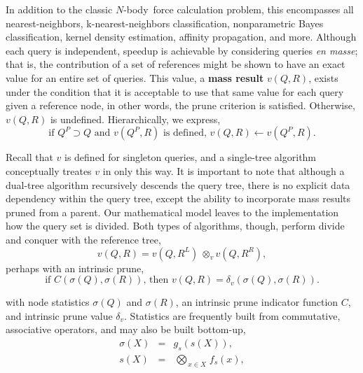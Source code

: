 \documentclass[twoside,leqno,twocolumn]{article}
\newcommand{\summary}{\delta}
\newcommand{\defterm}[1]{{\bf #1}}
\newcommand{\nbody}{$N$-body}
\newcommand{\kdleft}[1]{#1^{\!L}}
\newcommand{\kdright}[1]{#1^{\!R}}
\newcommand{\kdparent}[1]{#1^{\!P}}
\newcommand{\nameOp}[2]{\mathop{#1\nolimits\!\!_{#2}}}
\newcommand{\nameop}[2]{{\scriptstyle\:}#1_{\!#2}}
\newcommand{\myOp}[1]{\nameOp{\bigotimes}{#1}}
\newcommand{\myop}[1]{\nameop{\otimes}{#1}}
\newcommand{\letterqr}{v}
\newcommand{\opqr}{\myop{\letterqr}}
\newcommand{\letterqrv}{v}
\newcommand{\inqrv}{v}
\newcommand{\deltaqrv}{\summary_{\!\letterqrv}}
\newcommand{\canpruneqrv}{C}%
\newcommand{\letterstat}{s}
\newcommand{\outstat}{\sigma}
\newcommand{\instat}{s}
\newcommand{\Opstat}{\myOp{\letterstat}}
\newcommand{\fstat}{f_{\!\letterstat}}
\newcommand{\gstat}{g_{\!\letterstat}}
\begin{document}
\noindent
In addition to the classic \nbody\ force calculation problem, this encompasses all nearest-neighbors, k-nearest-neighbors classification, nonparametric Bayes classification, kernel density estimation, affinity propagation, and more.
Although each query is independent, speedup is achievable by considering queries {\it en masse}; that is, the contribution of a set of references might be shown to have an exact value for an entire set of queries.
This value, a \defterm{mass result} $\inqrv(Q, R)$, exists under the condition that it is acceptable to use that same value for each query given a reference node, in other words, the prune criterion is satisfied.
Otherwise, $\inqrv(Q,R)$ is undefined.
Hierarchically, we express,
\begin{equation}
\text{if } \kdparent{Q} \supset Q \text{ and }\inqrv(\kdparent{Q}, R)\text{ is defined, } \inqrv(Q, R) \gets \inqrv(\kdparent{Q}, R).
\label{eqn:qrvparent}
\end{equation}

\noindent
Recall that $\inqrv$ is defined for singleton queries, and a single-tree algorithm conceptually treates $\inqrv$ in only this way.
It is important to note that although a dual-tree algorithm recursively descends the query tree, there is no explicit data dependency within the query tree, except the ability to incorporate mass results pruned from a parent.
Our mathematical model leaves to the implementation how the query set is divided.
Both types of algorithms, though, perform divide and conquer with the reference tree,
\begin{equation}
\inqrv(Q, R) = \inqrv(Q, \kdleft{R}) \opqr \inqrv(Q, \kdright{R}),
\label{eqn:qrvcompose}
\end{equation}
\noindent perhaps with an intrinsic prune,
\begin{equation}
\text{if } \canpruneqrv(\outstat(Q), \outstat(R)) \text{, then } \inqrv(Q, R) = \deltaqrv(\outstat(Q), \outstat(R)).
\label{eqn:qrvprune}
\end{equation}

\noindent
with node statistics $\outstat(Q)$ and $\outstat(R)$, an intrinsic prune indicator function $\canpruneqrv$, and intrinsic prune value $\deltaqrv$.
Statistics are frequently built from commutative, associative operators, and may also be built bottom-up,
\begin{eqnarray}
\outstat(X) &=& \gstat(\instat(X)),
\\
\instat(X) &=& \Opstat_{x \in X} \fstat(x),
\label{eqn:defstat}
\end{eqnarray}
\end{document}
